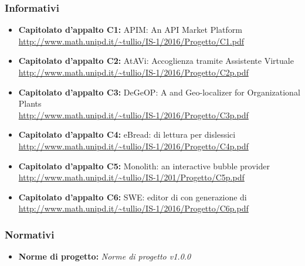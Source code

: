     \subsubsection{Informativi}
      \begin{itemize}
        \item \textbf{Capitolato d'appalto C1:} APIM: An API Market Platform \\
        \url{http://www.math.unipd.it/~tullio/IS-1/2016/Progetto/C1.pdf}
        \item \textbf{Capitolato d'appalto C2:} AtAVi: Accoglienza tramite Assistente Virtuale \\
        \url{http://www.math.unipd.it/~tullio/IS-1/2016/Progetto/C2p.pdf}
        \item \textbf{Capitolato d'appalto C3:} DeGeOP: A  and Geo-localizer  for
        Organizational Plants \\
        \url{http://www.math.unipd.it/~tullio/IS-1/2016/Progetto/C3p.pdf}
        \item \textbf{Capitolato d'appalto C4:} eBread:  di lettura per dislessici \\
        \url{http://www.math.unipd.it/~tullio/IS-1/2016/Progetto/C4p.pdf}
        \item \textbf{Capitolato d'appalto C5:} Monolith: an interactive bubble provider \\
        \url{http://www.math.unipd.it/~tullio/IS-1/201/Progetto/C5p.pdf}
        \item \textbf{Capitolato d'appalto C6:} SWE: editor di   con generazione di  \\
        \url{http://www.math.unipd.it/~tullio/IS-1/2016/Progetto/C6p.pdf}
      \end{itemize}
    \subsubsection{Normativi}
      \begin{itemize}
        \item \textbf{Norme di progetto:} \emph{Norme di progetto v1.0.0}
      \end{itemize}
